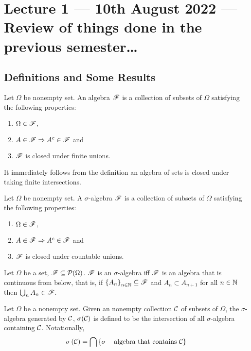 \section{Lecture 1 --- 10th August 2022 --- Review of things done in the previous semester\ldots}
\subsection{Definitions and Some Results}
\begin{definition}[algebra]
    Let $\Omega$ be nonempty set. An algebra ${\mathscr F}$ is a collection of subsets of $\Omega$ satisfying the following properties:
    \begin{enumerate}
	\item $\Omega \in {\mathscr F}$,
	\item $A\in {\mathscr F} \Rightarrow A^c \in {\mathscr F}$ and
	\item ${\mathscr F}$ is closed under finite unions.
    \end{enumerate}
    \label{def:algebra}
\end{definition}

It immediately follows from the definition an algebra of sets is closed under taking finite intersections.

\begin{definition}
    Let $\Omega$ be nonempty set. A $\sigma$-algebra ${\mathscr F}$ is a collection of subsets of $\Omega$ satisfying the following properties:
    \begin{enumerate}
	\item $\Omega \in {\mathscr F}$,
	\item $A\in {\mathscr F} \Rightarrow A^c \in {\mathscr F}$ and
	\item ${\mathscr F}$ is closed under countable unions.
    \end{enumerate}
    \label{def:sigma-algebra}
\end{definition}

\begin{fact}
    Let $\Omega$ be a set, ${\mathscr F} \subseteq {\cal P} (\Omega )$. ${\mathscr F}$ is an $\sigma$-algebra iff ${\mathscr F}$ is an algebra that is continuous from below, that is, if $\left\{ A_n \right\}_{n\in \mathbb N} \subseteq {\mathscr F}$ and $A_n \subset A_{n+1}$ for all $n\in \mathbb N$ then $\bigcup _n A_n \in {\mathscr F}$.
\end{fact}

\begin{definition}
    Let $\Omega$ be a nonempty set. Given an nonempty collection ${\cal C}$ of subsets of $\Omega$, the $\sigma$-algebra generated by ${\cal C}$, $\sigma ({\cal C})$ is defined to be the intersection of all $\sigma$-algebra containing ${\cal C}$. Notationally,
    $$\sigma \left( {\cal C} \right) = \bigcap \left\{ \sigma-\text{algebra that contains  }{\cal C} \right\}$$
    \label{def:generated-sigma-algebra}
\end{definition}

